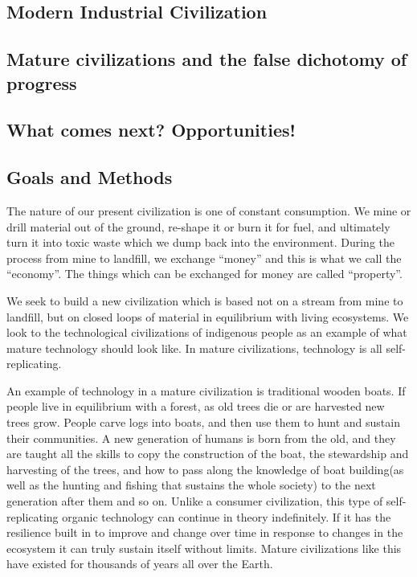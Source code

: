 

\subsection{Modern Industrial Civilization}
\subsection{Mature civilizations and the false dichotomy of progress}
\subsection{What comes next? Opportunities!}
\subsection{Goals and Methods}


The nature of our present civilization is one of constant consumption.
We mine or drill material out of the ground, re-shape it or burn it for
fuel, and ultimately turn it into toxic waste which we dump back into
the environment. During the process from mine to landfill, we exchange
``money'' and this is what we call the ``economy''. The things which can
be exchanged for money are called ``property''.

We seek to build a new civilization which is based not on a stream from
mine to landfill, but on closed loops of material in equilibrium with
living ecosystems. We look to the technological civilizations of
indigenous people as an example of what mature technology should look
like. In mature civilizations, technology is all self-replicating.

An example of technology in a mature civilization is traditional wooden
boats. If people live in equilibrium with a forest, as old trees die or
are harvested new trees grow. People carve logs into boats, and then use
them to hunt and sustain their communities. A new generation of humans
is born from the old, and they are taught all the skills to copy the
construction of the boat, the stewardship and harvesting of the trees,
and how to pass along the knowledge of boat building(as well as the
hunting and fishing that sustains the whole society) to the next
generation after them and so on. Unlike a consumer civilization, this
type of self-replicating organic technology can continue in theory
indefinitely. If it has the resilience built in to improve and change
over time in response to changes in the ecosystem it can truly sustain
itself without limits. Mature civilizations like this have existed for
thousands of years all over the Earth.

